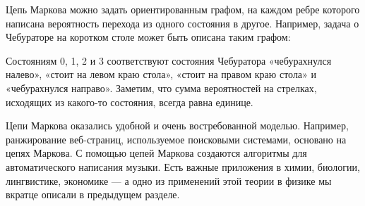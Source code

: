 \documentclass{article}
\begin{document}
Цепь Маркова можно задать ориентированным графом, 
на каждом ребре которого написана вероятность перехода из одного состояния в другое.
Например, задача о Чебураторе на коротком столе может быть описана таким графом:
\smallskip
\begin{center}
\end{center}
\smallskip
Состояниям 0, 1, 2 и 3 соответствуют состояния Чебуратора «чебурахнулся налево», «стоит на левом краю стола», «стоит на правом краю стола» и «чебурахнулся направо».
Заметим, что сумма вероятностей на стрелках, исходящих из какого-то состояния, всегда равна единице.

Цепи Маркова оказались удобной и очень востребованной моделью.
Например, ранжирование веб-страниц, используемое поисковыми системами, основано на цепях Маркова.
С помощью цепей Маркова создаются алгоритмы для автоматического написания музыки.
Есть важные приложения в химии, биологии, лингвистике, экономике --- а одно из применений этой теории в физике мы вкратце описали в предыдущем разделе.
\end{document}

